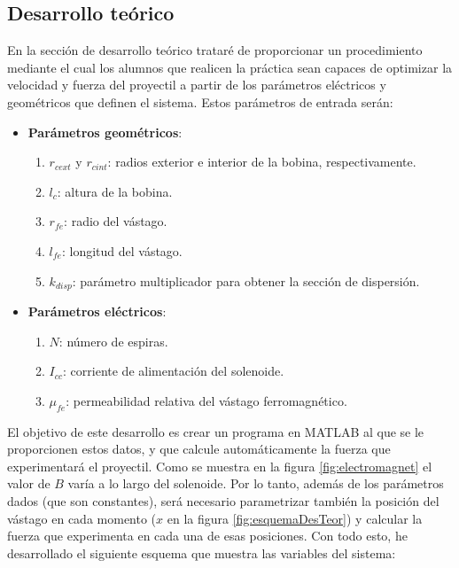 \subsection{Desarrollo teórico}
\label{subsec:desarrollo}
En la sección de desarrollo teórico trataré de proporcionar un procedimiento mediante el cual los alumnos que realicen la práctica sean capaces de optimizar la velocidad y fuerza del proyectil a partir de los parámetros eléctricos y geométricos que definen el sistema. Estos parámetros de entrada serán:
\begin{itemize}
    \item \textbf{Parámetros geométricos}:
    \begin{enumerate}[label=\alph*., leftmargin=*, itemindent=1em]
        \item \(r_{cext}\) y \(r_{cint} \): radios exterior e interior de la bobina, respectivamente.
        \item \(l_c\): altura de la bobina.
        \item \(r_{fe}\): radio del vástago.
        \item \(l_{fe}\): longitud del vástago.
        \item \(k_{disp}\): parámetro multiplicador para obtener la sección de dispersión.
    \end{enumerate}
    \item \textbf{Parámetros eléctricos}:
    \begin{enumerate}[label=\alph*., leftmargin=*, itemindent=1em]
        \item \(N\): número de espiras.
        \item \(I_{cc}\): corriente de alimentación del solenoide.
        \item \(\mu_{fe}\): permeabilidad relativa del vástago ferromagnético.
    \end{enumerate}
\end{itemize}

El objetivo de este desarrollo es crear un programa en MATLAB al que se le proporcionen estos datos, y que calcule automáticamente la fuerza que experimentará el proyectil. Como se muestra en la figura \ref{fig:electromagnet} el valor de
\(B\) varía a lo largo del solenoide. Por lo tanto, además de los parámetros dados (que son constantes), será necesario parametrizar también la posición del vástago en cada momento (\(x\) en la figura \ref{fig:esquemaDesTeor}) y calcular la fuerza que experimenta en cada una de esas posiciones. Con todo esto, he desarrollado el siguiente esquema que muestra las variables del sistema:

